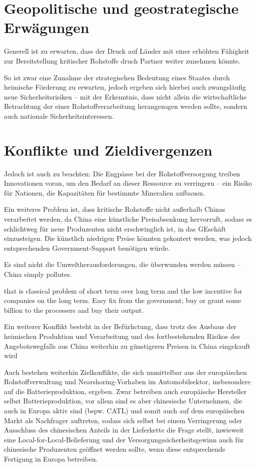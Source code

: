 \documentclass[12pt,a4paper,oneside]{book} %
\begin{document}
{\section{Geopolitische und geostrategische Erwägungen}

Generell ist zu erwarten, dass der Druck auf Länder mit einer erhöhten Fähigkeit zur Bereitstellung kritischer Rohstoffe druch Partner weiter zunehmen könnte. 

So ist zwar eine Zunahme der strategischen Bedeutung eines Staates durch heimische Förderung zu erwarten, jedoch ergeben sich hierbei auch zwangsläufig neue Sicherheitsrisiken -- mit der Erkenntnis, dass nicht allein die wirtschaftliche Betrachtung der einer Rohstoffverarbeitung herangezogen werden sollte, sondern auch nationale Sicherheitsinteressen.\autocite[Hier am Beispiel Schweden]{UI Report}



\section{Konflikte und Zieldivergenzen}

Jedoch ist auch zu beachten: Die Engpässe bei der Rohstoffversorgung treiben Innovationen voran, um den Bedarf an dieser Ressource zu verringern – ein Risiko für Nationen, die Kapazitäten für bestimmte Mineralien aufbauen.

Ein weiteres Problem ist, dass kritische Rohstoffe nicht außerhalb Chinas verarbeitet werden, da China eine künstliche Preisabsenkung hervorruft, sodass es schlichtweg für neue Produzenten nicht erschwinglich ist, in das GEschäft einzusteigen. Die künstlich niedrigen Preise könnten gekontert werden, was jedoch entsprechenden Government-Support benötigen würde.

Es sind nicht die Umweltherausforderungen, die überwunden werden müssen -- China simply pollutes.



that is classical problem of short term over long term and the low incentive for companies on the long term. Easy fix from the government; buy or grant some billion to the processers and buy their output.

Ein weiterer Konflikt besteht in der Befürhctung, dass trotz des Ausbaus der heimischen Produktion und Verarbeitung und des fortbestehenden Risikos des Angebotswegfalls aus China weiterhin zu günstigeren Preisen in China eingekauft wird

Auch bestehen weiterhin Zielkonflikte, die sich unmittelbar aus der europäischen Rohstoffverwaltung und Nearshoring-Vorhaben im Automobilsektor, insbesondere auf die Batterieproduktion, ergeben. Zwar betreiben auch europäische Hersteller selbst Batterieproduktion, vor allem sind es aber chinesische Unternehmen, die auch in Europa aktiv sind (bspw. CATL) und somit auch auf dem europäischen Markt als Nachfrager auftreten, sodass sich selbst bei einem Verringerung oder Ausschluss des chinesischen Anteils in der Lieferkette die Frage stellt, inwieweit eine Local-for-Local-Belieferung und der Versorgungssicherheitsgewinn auch für chinesische Produzenten geöffnet werden sollte, wenn diese entsprechende Fertigung in Europa betreiben.


}
\end{document}
